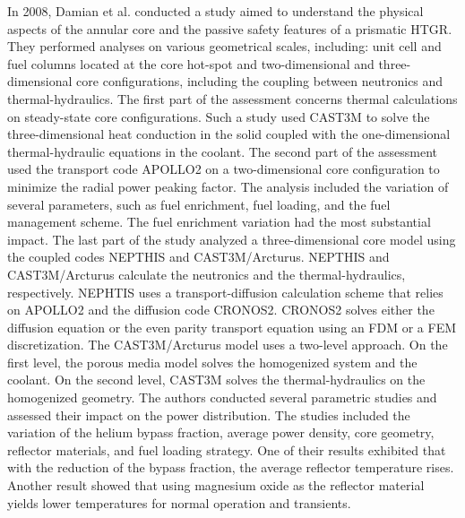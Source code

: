 In 2008, Damian et al. \cite{damian_vhtr_2008} conducted a study aimed to understand the physical aspects of the annular core and the passive safety features of a prismatic \gls{HTGR}.
They performed analyses on various geometrical scales, including: unit cell and fuel columns located at the core hot-spot and two-dimensional and three-dimensional core configurations, including the coupling between neutronics and thermal-hydraulics.
The first part of the assessment concerns thermal calculations on steady-state core configurations.
Such a study used CAST3M \cite{studer_cast3marcturus_2007} to solve the three-dimensional heat conduction in the solid coupled with the one-dimensional thermal-hydraulic equations in the coolant.
The second part of the assessment used the transport code APOLLO2 \cite{sanchez_apollo2_1999} on a two-dimensional core configuration to minimize the radial power peaking factor.
The analysis included the variation of several parameters, such as fuel enrichment, fuel loading, and the fuel management scheme.
The fuel enrichment variation had the most substantial impact.
The last part of the study analyzed a three-dimensional core model using the coupled codes NEPTHIS \cite{cavalier_presentation_2005} and CAST3M/Arcturus.
NEPTHIS and CAST3M/Arcturus calculate the neutronics and the thermal-hydraulics, respectively.
NEPHTIS uses a transport-diffusion calculation scheme that relies on APOLLO2 and the diffusion code CRONOS2.
CRONOS2 solves either the diffusion equation or the even parity transport equation using an \gls{FDM} or a \gls{FEM} discretization.
The CAST3M/Arcturus model uses a two-level approach.
On the first level, the porous media model solves the homogenized system and the coolant.
On the second level, CAST3M solves the thermal-hydraulics on the homogenized geometry.
The authors conducted several parametric studies and assessed their impact on the power distribution.
The studies included the variation of the helium bypass fraction, average power density, core geometry, reflector materials, and fuel loading strategy.
One of their results exhibited that with the reduction of the bypass fraction, the average reflector temperature rises.
Another result showed that using magnesium oxide as the reflector material yields lower temperatures for normal operation and transients.

